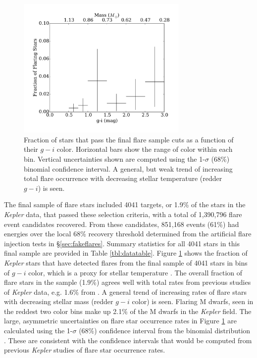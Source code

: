\documentclass[twocolumn]{aastex6}
\newcommand{\Kepler}{\textsl{Kepler}\xspace}
\begin{document}
\begin{figure}[!t]
\centering
\includegraphics[width=3.25in]{fig4}
\caption{
Fraction of stars that pass the final flare sample cuts as a function of their $g-i$ color. Horizontal bars show the range of color within each bin. Vertical uncertainties shown are computed using the 1-$\sigma$ (68\%) binomial confidence interval. A general, but weak trend of increasing total flare occurrence with decreasing stellar temperature (redder $g-i$) is seen.
}
\label{fig:Nvsgi}
\end{figure}



The final sample of flare stars included 4041 targets, or 1.9\% of the stars in the \Kepler data, that passed these selection criteria, with a total of 1,390,796 flare event candidates recovered. From these candidates, 851,168 events (61\%) had energies over the local 68\% recovery threshold determined from the artificial flare injection tests in \S\ref{sec:fakeflares}. Summary statistics for all 4041 stars in this final sample are provided in Table \ref{tbl:datatable}.
Figure \ref{fig:Nvsgi} shows the fraction of \Kepler stars that have detected flares from the final sample of 4041 stars in bins of $g-i$ color, which is a proxy for stellar temperature \citep{covey2007,davenport2014}. The overall fraction of flare stars in the sample (1.9\%) agrees well with total rates from previous studies of \Kepler data, e.g. 1.6\% from \citet{walkowicz2011}. A general trend of increasing rates of flare stars with decreasing stellar mass (redder $g-i$ color) is seen. Flaring M dwarfs, seen in the reddest two color bins make up 2.1\% of the M dwarfs in the \Kepler field. The large, asymmetric uncertainties on flare star occurrence rates in Figure \ref{fig:Nvsgi} are calculated using the 1-$\sigma$ (68\%) confidence interval from the binomial distribution \citep[e.g. see][]{burgasser2003}. These are consistent with the confidence intervals that would be computed from previous \Kepler studies of flare star occurrence rates.
\end{document}
